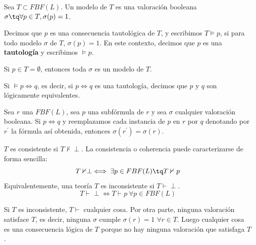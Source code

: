 \begin{defn}[Modelo]
	Sea $T\subset FBF(L)$. Un modelo de $T$ es una valoración booleana $\sigma \tq \forall p\in T, \sigma (p) = 1$.
\end{defn}

\begin{defn}
	Decimos que $p$ es una consecuencia tautológica de $T$, y escribimos $T\vDash p$, si para todo modelo $\sigma$ de $T$, $\sigma(p) = 1$. En este contexto, decimos que $p$ es una \textbf{tautología} y escribimos  $\vDash p$.
\end{defn}

\begin{obs}
	Si $p\in T = \emptyset$, entonces toda $\sigma$ es un modelo de $T$.
\end{obs}

\newpage

\begin{defn}
	Si $\vDash p \iff q$, es decir, si $p\iff q$ es una tautología, decimos que $p$ y $q$ son lógicamente equivalentes.
\end{defn}

\begin{obs}
	Sea $r$ una $FBF(L)$, sea $p$ una subfórmula de $r$ y sea $\sigma$ cualquier valoración booleana. Si $p\iff q$ y reemplazamos cada instancia de $p$ en $r$ por $q$ denotando por $r^\prime$ la fórmula así obtenida, entonces $\sigma(r^\prime) = \sigma(r)$.
\end{obs}

\begin{defn}
 $T$ es consistente si $T\nvdash \perp$. La consistencia o coherencia puede caracterizarse de forma sencilla:
 $$T\nvdash\perp \iff \exists p\in FBF(L) \tq  T\nvdash p$$
 Equivalentemente, una teoría $T$ es inconsistente si $T\vdash \perp$.
 $$T\vdash\perp \iff T\vdash p\ \forall p\in FBF(L)$$

\end{defn}

\begin{obs}
	Si $T$ es inconsistente, $T\vdash$ cualquier cosa.
	Por otra parte, ninguna valoración satisface $T$, es decir, ninguna $\sigma$ cumple $\sigma(r) = 1$ $\forall r\in T$. Luego cualquier cosa es una consecuencia lógica de $T$ porque no hay ninguna valoración que satisfaga $T$.
\end{obs}

